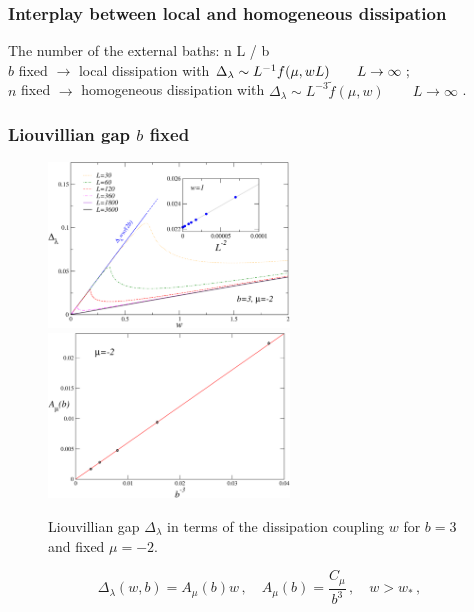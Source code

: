 \begin{frame}
	\frametitle{Interplay between local and homogeneous dissipation}
	The number of the external baths:
	\be{}
		n \equiv L / b \pc
	\ee
	$ $\\
	\vspace{0.5cm}
	$b$ fixed  $\longrightarrow$ local dissipation with 
	$\Delta_\lambda \sim L^{-1} f(\mu, wL) 
	\qquad L\to\infty \,\, ;$\\
	\vspace{1cm}
	$n$ fixed $\longrightarrow$ homogeneous dissipation with
	$\Delta_\lambda \sim L^{-3} \tilde{f}(\mu, w)
	\qquad L\to\infty\,\,$.
\end{frame}

\begin{frame}
	\frametitle{Liouvillian gap $b$ fixed}
\begin{figure}[!h]
    \centering
    \includegraphics[width=6.4cm]{imm/gapliouv3b.pdf}
	\includegraphics[width=6.4cm]{imm/ratelatetime.pdf}
    \caption{Liouvillian gap $\Delta_\lambda$ in terms of the dissipation coupling $w$ for $b=3$ and fixed $\mu=-2$.}
    \label{fig_liouvgap3b}
\end{figure}
\begin{equation}
    \Delta_\lambda(w, b)=A_\mu(b) w\,,\quad A_\mu(b)=\frac{C_\mu}{b^{3}}\,,\quad w>w_*\,,
    \label{eq_liouvillian_gap_largeL}
\end{equation}
\end{frame}

